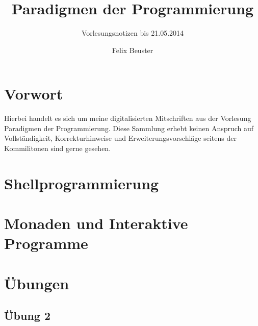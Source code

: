 \documentclass[11pt,a4paper]{scrartcl}
\title{Paradigmen der Programmierung}
\subtitle{Vorlesungsnotizen bis 21.05.2014}
\author{Felix Beuster}
\date{}
\begin{document}
\setlength{\parindent}{0ex}
\maketitle
\newpage
\tableofcontents
\newpage

\section*{Vorwort} %
\label{sec:vorwort}

	Hierbei handelt es sich um meine digitalisierten Mitschriften aus der Vorlesung Paradigmen der
	Programmierung. Diese Sammlung erhebt keinen Anspruch auf Vollständigkeit, Korrekturhinweise
	und Erweiterungsvorschläge seitens der Kommilitonen sind gerne gesehen.


\section{Shellprogrammierung} %
\label{sec:shellprogrammierung}

\clearpage
\section{Monaden und Interaktive Programme} %
\label{sec:monaden_und_interaktive_programme}


\clearpage
\appendix
\section{Übungen} %
\label{sec:uebungen}

	\subsection{Übung 2} %
	\label{sub:uebung_2}

	
	



\end{document}
